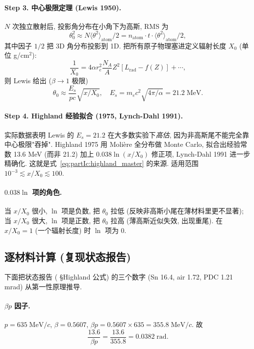 \paragraph{Step 3. 中心极限定理 (Lewis 1950).} $N$ 次独立散射后, 投影角分布在小角下为高斯, RMS 为
\begin{equation}
  \theta_0^2 \approx N \langle \theta^2 \rangle_\mathrm{atom} / 2
  = n_\mathrm{atom} \cdot t \cdot \langle\theta^2\rangle_\mathrm{atom}/2,
\end{equation}
其中因子 $1/2$ 把 3D 角分布投影到 1D. 把所有原子物理塞进定义辐射长度 $X_0$ (单位 g/cm$^2$):
\begin{equation}
  \frac{1}{X_0} = 4\alpha r_e^2 \frac{N_A}{A} Z^2 [L_\mathrm{rad} - f(Z)] + \cdots,
\end{equation}
则 Lewis 给出 ($\beta \to 1$ 极限)
\begin{equation}
  \theta_0 \approx \frac{E_s}{p c} \sqrt{x/X_0},
  \quad
  E_s = m_e c^2 \sqrt{4\pi/\alpha} = 21.2\;\mathrm{MeV}.
  \label{eq:partIc:lewis}
\end{equation}

\paragraph{Step 4. Highland 经验拟合 (1975, Lynch-Dahl 1991).} 实际数据表明 Lewis 的 $E_s = 21.2$ 在大多数实验下\emph{高估}, 因为非高斯尾不能完全靠中心极限"吞掉". Highland 1975 用 Molière 全分布做 Monte Carlo, 拟合出经验常数 13.6 MeV (而非 21.2) 加上 $0.038 \ln(x/X_0)$ 修正项, Lynch-Dahl 1991 进一步精确化. 这就是式~\eqref{eq:partIc:highland_master} 的来源. 适用范围 $10^{-3} \lesssim x/X_0 \lesssim 100$.

\paragraph{$0.038 \ln$ 项的角色.} 当 $x/X_0$ 很小, $\ln$ 项是负数, 把 $\theta_0$ 拉低 (反映非高斯小尾在薄材料里更不显著); 当 $x/X_0$ 很大, $\ln$ 项是正数, 把 $\theta_0$ 拉高 (薄高斯近似失效, 出现重尾). 在 $x/X_0 = 1$ (一个辐射长度) 时 $\ln$ 项为 0.

\subsection{逐材料计算 (复现状态报告)}

下面把状态报告 (\StatusReport{} §Highland 公式) 的三个数字 (Sn 16.4, air 1.72, PDC 1.21 mrad) 从第一性原理推导.

\paragraph{$\beta p$ 因子.} $p = 635\;\mathrm{MeV}/c$, $\beta = 0.5607$, $\beta p = 0.5607 \times 635 = 355.8\;\mathrm{MeV}/c$. 故
\begin{equation}
  \frac{13.6}{\beta p} = \frac{13.6}{355.8} = 0.0382\;\mathrm{rad}.
  \label{eq:partIc:highland_prefactor}
\end{equation}

